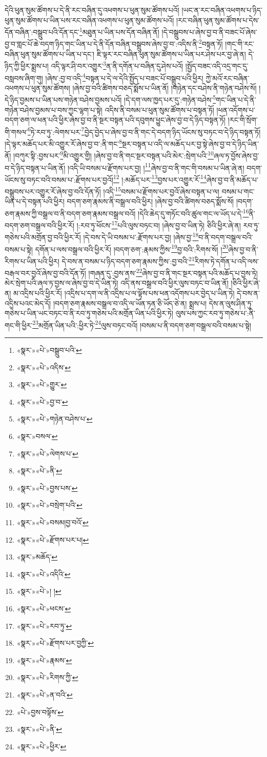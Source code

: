 དེའི་ཕུན་སུམ་ཚོགས་པ་དེ་ནི་རང་བཞིན་དུ་འཕགས་པ་ཕུན་སུམ་ཚོགས་པའོ། །ཡང་ན་རང་བཞིན་འཕགས་པ་ཉིད་ཕུན་སུམ་ཚོགས་པ་ཡིན་པས་རང་བཞིན་འཕགས་པ་ཕུན་སུམ་ཚོགས་པའོ། །རང་བཞིན་ཕུན་སུམ་ཚོགས་པ་དེས་དོན་བཞིན་:བསྒྲུབ་པའི་དོན་དང་\footnote{«སྣར་»«པེ་»བསྒྲུབ་པའི་}མཐུན་པ་ཡིན་པས་དོན་བཞིན་ནོ། །དེ་བསྒྲུབས་པ་ཞེས་བྱ་བ་ནི་བཟང་པོ་ཞེས་བྱ་བ་གླང་པོ་ཆེ་བདག་ཉིད་གང་ཡིན་པ་དེ་ནི་དོན་བཞིན་བསྒྲུབས་ཞེས་བྱ་བ་:འདིས་ནི་\footnote{«སྣར་»«པེ་»འདིས་}བསྟན་ཏོ། །གང་གི་རང་བཞིན་ཕུན་སུམ་ཚོགས་པ་ཡིན་པ་དང་། ཇི་ལྟར་རང་བཞིན་ཕུན་སུམ་ཚོགས་པ་ཡིན་པར་ཤེས་པར་བྱ་ཞེ་ན། དེ་ཉིད་ཀྱི་ཕྱིར་སྨྲས་པ། འདི་ལྟར་ཤི་བར་འགྱུར་\footnote{«སྣར་»«པེ་»གྱུར་}ན་ནི་དགོན་པ་བཞིན་དུ་ཤེས་པའོ། །སྤྱོད་བཟང་འདི་འདྲ་གང་དུ་བསླབས་ཞིག་གུ། །ཞེས་:བྱ་བ་འདི་\footnote{«སྣར་»«པེ་»བྱ་བ་}བསྟན་པ་དེ་ལ་དེའི་སྤྱོད་པ་བཟང་པོ་བསྒྲུབ་པའི་ཕྱིར། ཀྱེ་མའོ་རང་བཞིན་འཕགས་པ་ཕུན་སུམ་ཚོགས། །ཞེས་བྱ་བའི་ཚིགས་བཅད་སྨོས་པ་ཡིན་ནོ། །གཉེན་དང་བཤེས་ནི་གཉེན་བཤེས་སོ། །དེ་ཉིད་བྱམས་པ་ཡིན་པས་གཉེན་བཤེས་བྱམས་པའོ། །དེ་དག་ལས་ཁྱད་པར་དུ་:གཉེན་བཤེས་\footnote{«སྣར་»«པེ་»གཉེན་བཤེས་པ་}གང་ཡིན་པ་དེ་ནི་གཉེན་བཤེས་བྱམས་པ་བས་ཀྱང་ལྷག་པ་སྟེ། འདིས་ནི་བསམ་པ་ཕུན་སུམ་ཚོགས་པ་བསྟན་ཏོ། །ཕན་འདོགས་པ་བདག་ཅག་ལ་ཕན་པའི་ཕྱིར་ཞེས་བྱ་བ་ནི་སྔར་བསྟན་པའི་དབུགས་ཕྱུང་ཞེས་བྱ་བ་དེ་ཉིད་བསྟན་ཏོ། །རང་གི་སྲོག་གི་གསལ་\footnote{«སྣར་»བསལ་}ཏེ་རབ་ཏུ་:ལེགས་པར་\footnote{«སྣར་»«པེ་»ལེགས་པ་}བྱེད་བྱེད་པ་ཞེས་བྱ་བ་ནི་གང་དེ་བདག་ཉིད་ཡོངས་སུ་བཏང་བ་དེ་ཉིད་བསྟན་ཏོ། །དེ་ལྟར་མཆོད་པར་མི་འགྱུར་རོ་ཞེས་བྱ་བ་:ནི་གང་\footnote{«སྣར་»«པེ་»ནི་}སྔར་བསྟན་པ་འདི་ལ་མཆོད་པར་བྱ་སྟེ་ཞེས་བྱ་བ་དེ་ཉིད་ཡིན་ནོ། །བཀུར་སྟི་:བྱས་པར་\footnote{«སྣར་»«པེ་»བྱས་པས་}མི་འགྱུར་གྱི། །ཞེས་བྱ་བ་ནི་གང་སྔར་བསྟན་པའི་མེར་:སྲེག་པའི་\footnote{«སྣར་»«པེ་»བསྲེག་པའི་}ཞལ་ཏ་བྱོས་ཞེས་བྱ་བ་དེ་ཉིད་བསྟན་པ་ཡིན་ནོ། །འདི་ཡི་བསམ་པ་རྫོགས་པར་བྱ། །\footnote{«སྣར་»«པེ་»བསམ།བྱ་བའོ་}ཞེས་བྱ་བ་ནི་གང་གི་བསམ་པ་ཡིན་ཞེ་ན། བདག་ཡོངས་སུ་བཏང་བའི་བསམ་པ་:རྫོགས་པར་བྱའོ།\footnote{«སྣར་»«པེ་»རྫོགས་པར་པ།} །:མཆོད་པར་\footnote{«སྣར་»མཆོད་}བྱས་པར་འགྱུར་རོ་\footnote{«སྣར་»«པེ་»འདིའི་}ཞེས་བྱ་བ་ནི་མཆོད་པ་བསྒྲུབས་པར་འགྱུར་རོ་ཞེས་བྱ་བའི་དོན་ཏོ། །འདི་\footnote{«སྣར་»«པེ་»། །}བསམ་པ་རྫོགས་པར་བྱའོ་ཞེས་བསྟན་པ་ལ། བསམ་པ་གང་ཡིན་པ་དེ་བསྟན་པའི་ཕྱིར། བདག་ཅག་རྣམས་ནི་བསྒྲལ་བའི་ཕྱིར། །ཞེས་བྱ་བའི་ཚིགས་བཅད་སྨོས་སོ། །བདག་ཅག་རྣམས་ཀྱི་བསྒྲལ་བ་ནི་བདག་ཅག་རྣམས་བསྒྲལ་བའོ། །དེའི་ཆེད་དུ་གཏོང་བའི་ཚུལ་གང་ལ་ཡོད་པ་དེ་\footnote{«སྣར་»«པེ་»ཕངས་}ནི་བདག་ཅག་བསྒྲལ་བའི་ཕྱིར་རོ། །:རབ་ཏུ་ཕོངས་\footnote{«སྣར་»«པེ་»རབ་ཏུ་}པའི་ལུས་བཏང་བ། །ཞེས་བྱ་བ་ཡིན་ཏེ། ཅིའི་ཕྱིར་ཞེ་ན། རབ་ཏུ་གཅེས་པའི་མགྲོན་བྱ་བའི་ཕྱིར་རོ། །དེ་བས་དེ་ཡི་བསམ་པ་:རྫོགས་པར་བྱ། །ཞེས་བྱ་\footnote{«སྣར་»«པེ་»རྫོགས་པར་བྱཀྱི་}བ་ནི་བདག་བསྒྲལ་བའི་བསམ་པ་སྟེ། དགོན་པ་ལས་བསྒྲལ་བའི་ཕྱིར་རོ། །བདག་ཅག་:རྣམས་ཀྱིས་\footnote{«སྣར་»«པེ་»རྣམས་}བྱ་བའི་:རིགས་སོ། །\footnote{«སྣར་»«པེ་»རིགས་ཀྱི་}ཞེས་བྱ་བ་ནི་རིགས་པ་ཡིན་པའི་ཕྱིར། དེ་བས་ན་བསམ་པ་ཉིད་བདག་ཅག་རྣམས་ཀྱིས་:བྱ་བའི་\footnote{«སྣར་»«པེ་»ན་བའི་}རིགས་ཏེ་དགོན་པ་འདི་ལས་བརྒལ་བར་བྱའོ་ཞེས་བྱ་བའི་དོན་ཏོ། །གཞན་དུ་:བྱས་ནས་\footnote{«པེ་»བྱས་བལྟོས་}ཞེས་བྱ་བ་ནི་གང་སྔར་བསྟན་པའི་མཆོད་པ་བྱས་ཏེ། མེར་སྲེག་པའི་ཞལ་ཏ་བྱས་ལ་ཞེས་བྱ་བ་དེ་ཡིན་ཏེ། འདི་ནས་བསྒྲལ་བའི་ཕྱིར་ལུས་བཏང་བ་ཡིན་ནོ། །ཅིའི་ཕྱིར་ཞེ་ན། མ་འདྲིས་པའི་ཕྱིར་རོ། །འདྲིས་པ་དག་ལ་ནི་འདྲིས་པ་ལ་ལྟོས་པས་ཕན་འདོགས་པར་བྱེད་པ་ཡིན་ཏེ། དེ་བས་ན་འདྲིས་པའང་མེད་དོ། །བདག་ཅག་རྣམས་བསྒྲལ་བ་འདི་ལ་ཡོན་ཏན་ཅི་ཡོད་ཅེ་ན། སྨྲས་པ། དེས་ན་ལུས་ཤིན་ཏུ་གཅེས་པ་ཡིན་ཡང་བཏང་བ་ནི་རབ་ཏུ་གཅེས་པའི་མགྲོན་ཡིན་པའི་ཕྱིར་ཏེ། ལུས་པས་ཀྱང་རབ་ཏུ་གཅེས་པ་:ནི་གང་གི་ཕྱིར་\footnote{«སྣར་»«པེ་»ནི་}མགྲོན་ཡིན་པའི་:ཕྱིར་ཏེ་\footnote{«སྣར་»«པེ་»ཕྱིར་}ལུས་བཏང་བའོ། །བསམ་པ་ནི་བདག་ཅག་བསྒྲལ་བའི་བསམ་པ་སྟེ། 